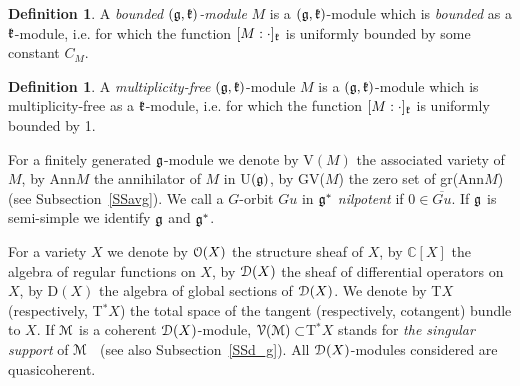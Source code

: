 \documentclass[12pt]{amsart}
\theoremstyle{definition}\newtheorem{theorem}{Theorem}[section]
\theoremstyle{definition}\newtheorem{definition}[proposition]{Definition}
\theoremstyle{remark}\newtheorem{example}[proposition]{Example}
\begin{document}
\begin{definition}\label{Dbm} A {\it bounded $(\frak g, \frak k)$-module} $M$ is a $(\frak g, \frak k)$-module which is {\it bounded} as a $\frak k$-module, i.e. for which the function $[M:\cdot]_\frak k$ is uniformly bounded by some constant $C_M$.\end{definition}
\begin{definition} A {\it multiplicity-free} $(\frak g, \frak k)$-module $M$ is a $(\frak g, \frak k)$-module which is multiplicity-free as a $\frak k$-module, i.e. for which the function $[M:\cdot]_\frak k$ is uniformly bounded by 1.\end{definition}
For a finitely generated $\frak g$-module we denote by V$(M)$ the associated variety of $M$, by Ann$M$ the annihilator of $M$ in U$(\frak g)$, by GV($M$) the zero set of gr(Ann$M$) (see Subsection~\ref{SSavg}). We call a $G$-orbit $Gu$ in $\frak g^*$ {\it nilpotent} if $0\in\overline{Gu}$. If $\frak g$ is semi-simple we identify $\frak g$ and $\frak g^*$.

For a variety $X$ we denote by $\EuScript O(X)$ the structure sheaf of $X$, by $\mathbb C[X]$ the algebra of regular functions on $X$, by $\EuScript D(X)$ the sheaf of differential operators on $X$, by D$(X)$ the algebra of global sections of $\EuScript D(X)$. We denote by T$X$ (respectively, T$^*X$) the total space of the tangent (respectively, cotangent) bundle to $X$. If $\EuScript M$ is a coherent $\EuScript D(X)$-module, $\EuScript V(\EuScript M)\subset$T$^*X$ stands for {\it the singular support} of $\EuScript M$~\cite{Bo} (see also Subsection~\ref{SSd_g}).  All $\EuScript D(X)$-modules considered are quasicoherent.
\end{document}
